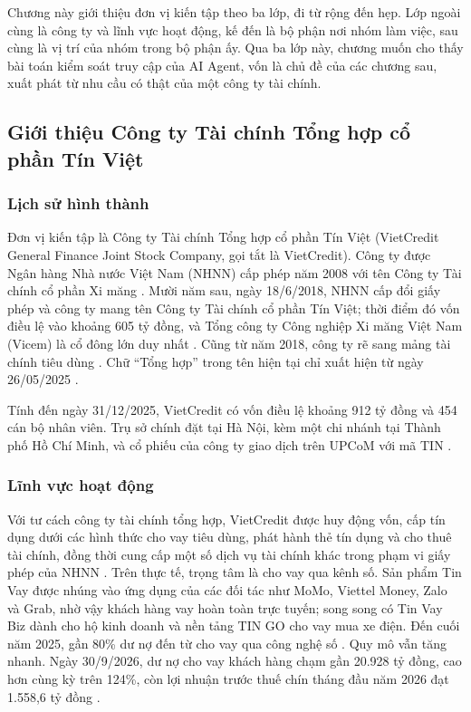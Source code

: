 \documentclass[a4paper]{article}
\begin{document}
Chương này giới thiệu đơn vị kiến tập theo ba lớp, đi từ rộng đến hẹp. Lớp ngoài cùng là công ty và lĩnh vực hoạt động, kế đến là bộ phận nơi nhóm làm việc, sau cùng là vị trí của nhóm trong bộ phận ấy. Qua ba lớp này, chương muốn cho thấy bài toán kiểm soát truy cập của AI Agent, vốn là chủ đề của các chương sau, xuất phát từ nhu cầu có thật của một công ty tài chính.

\subsection{Giới thiệu Công ty Tài chính Tổng hợp cổ phần Tín Việt}

\subsubsection{Lịch sử hình thành}

Đơn vị kiến tập là Công ty Tài chính Tổng hợp cổ phần Tín Việt (VietCredit General Finance Joint Stock Company, gọi tắt là VietCredit). Công ty được Ngân hàng Nhà nước Việt Nam (NHNN) cấp phép năm 2008 với tên Công ty Tài chính cổ phần Xi măng \parencite{vietcredit_bctn2025}. Mười năm sau, ngày 18/6/2018, NHNN cấp đổi giấy phép và công ty mang tên Công ty Tài chính cổ phần Tín Việt; thời điểm đó vốn điều lệ vào khoảng 605 tỷ đồng, và Tổng công ty Công nghiệp Xi măng Việt Nam (Vicem) là cổ đông lớn duy nhất \parencite{nhadautu_doiten2018}. Cũng từ năm 2018, công ty rẽ sang mảng tài chính tiêu dùng \parencite{vietcredit_bctn2025}. Chữ ``Tổng hợp'' trong tên hiện tại chỉ xuất hiện từ ngày 26/05/2025 \parencite{baodautu_doiten2025}.

Tính đến ngày 31/12/2025, VietCredit có vốn điều lệ khoảng 912 tỷ đồng và 454 cán bộ nhân viên. Trụ sở chính đặt tại Hà Nội, kèm một chi nhánh tại Thành phố Hồ Chí Minh, và cổ phiếu của công ty giao dịch trên UPCoM với mã TIN \parencite{vietcredit_bctn2025}.

\subsubsection{Lĩnh vực hoạt động}

Với tư cách công ty tài chính tổng hợp, VietCredit được huy động vốn, cấp tín dụng dưới các hình thức cho vay tiêu dùng, phát hành thẻ tín dụng và cho thuê tài chính, đồng thời cung cấp một số dịch vụ tài chính khác trong phạm vi giấy phép của NHNN \parencite{vietcredit_bctn2025}. Trên thực tế, trọng tâm là cho vay qua kênh số. Sản phẩm Tin Vay được nhúng vào ứng dụng của các đối tác như MoMo, Viettel Money, Zalo và Grab, nhờ vậy khách hàng vay hoàn toàn trực tuyến; song song có Tin Vay Biz dành cho hộ kinh doanh và nền tảng TIN GO cho vay mua xe điện. Đến cuối năm 2025, gần 80\% dư nợ đến từ cho vay qua công nghệ số \parencite{vietcredit_kqkd2025}. Quy mô vẫn tăng nhanh. Ngày 30/9/2026, dư nợ cho vay khách hàng chạm gần 20.928 tỷ đồng, cao hơn cùng kỳ trên 124\%, còn lợi nhuận trước thuế chín tháng đầu năm 2026 đạt 1.558,6 tỷ đồng \parencite{vnba_9t2026}.
\end{document}
